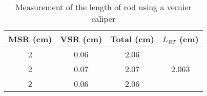 \begin{table}[H]
    \centering
    \begin{tabular}{|c|c|c|c|} \hline
        MSR (cm) & VSR (cm) & Total (cm) & $L_{RT}$ (cm) \\ \hline
        2 & 0.06 & 2.06 & \\
        2 & 0.07 & 2.07 & 2.063\\
        2 & 0.06 & 2.06 & \\
        \hline
        \end{tabular}    
        \caption{Measurement of the length of rod using a vernier caliper}
        \label{tab:2}
\end{table}